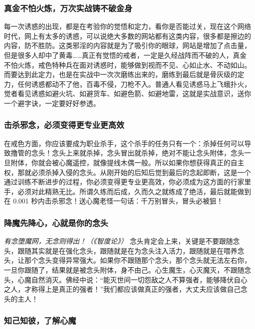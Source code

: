 \subsubsection{真金不怕火炼，万次实战铸不破金身}

每一次诱惑的出现，都是在考验你的觉悟和定力，看你是否能过关，现在这个网络时代，网上有太多的诱惑，可以说绝大多数的网站都有这类内容，很多都是擦边的内容，防不胜防。这类邪淫的内容就是为了吸引你的眼球，网站是增加了点击量，但是很多人却中了黄毒……真正有觉悟的戒者，一定是久经战阵而不破的人，真金不怕火炼，戒色特种兵在面对诱惑时，能够做到视而不见、心如止水、不动如山。而要达到此定力，也是在实战中一次次磨练出来的，磨练到最后就是骨灰级的定力，任何诱惑都动不了他，百毒不侵，刀枪不入。普通人看见诱惑马上飞蛾扑火，觉者看见诱惑如避火坑、如避货车、如避色箭、如避地雷，这就是实战意识，送你一个避字诀，一定要好好参透。

\subsubsection{击杀邪念，必须变得更专业更高效}

在戒色方面，你应该要成为职业杀手，这个杀手的任务只有一个：杀掉任何可以导致撸管的念头！念头上来就杀掉，念头冒出就杀掉，绝对不能让念头附体，念头一旦附体，你就会被心魔遥控，就像提线木偶一般。所以如果你想获得真正的自主权，那就必须杀掉入侵的念头。从刚开始的后知后觉到最后的念起即断，这是一个通过训练不断进步的过程，你必须变得更专业更高效，你必须成为这方面的行家里手，必须对此精熟无比。所谓久练而后成，久而久之就练成了绝活，最后就能做到在 0.001 秒内击杀邪念！送心魔老怪一句话：千万别冒头，冒头必被狙！

\subsubsection{降魔先降心，心就是你的念头}

\textit{有念堕魔网，无念则得出！（《智度论》）} 念头肯定会上来，关键是不要跟随念头，跟随其实就是在强化念头，跟随就是在为念头注入活力，跟随就是在喂养念头，让那个念头变得异常强大。如果你不跟随那个念头，那个念头就无法左右你，一旦你跟随了，结果就是被念头附体，身不由己。心生魔生，心灭魔灭，不跟随念头，心魔自然消灭。佛经中说：“能灭世间一切怨敌之人不算强者，能够降伏自心之人，才称得上是真正的强者！”我们都应该做真正的强者，大丈夫应该做自己念头的主人！

\subsubsection{知己知彼，了解心魔}

